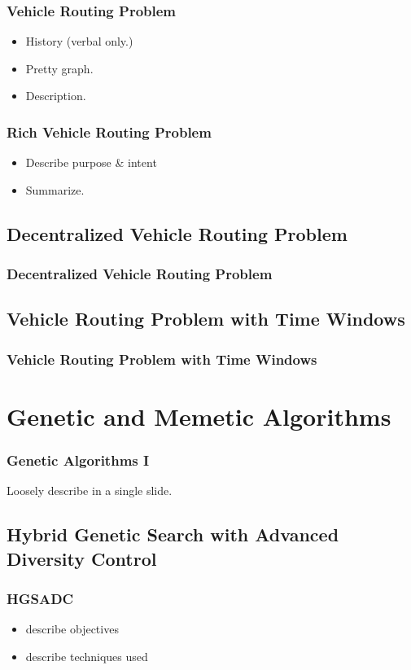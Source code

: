 \documentclass{beamer}
\begin{document}
\begin{frame}
\frametitle{Vehicle Routing Problem}
	\begin{itemize}
		\item History (verbal only.)
		\item Pretty graph.
		\item Description.
	\end{itemize}
\end{frame}

\begin{frame}
\frametitle{Rich Vehicle Routing Problem}
	\begin{itemize}
		\item Describe purpose \& intent
		\item Summarize.
	\end{itemize}
\end{frame}


\subsection{Decentralized Vehicle Routing Problem}

\begin{frame}
\frametitle{Decentralized Vehicle Routing Problem}
\end{frame}

\subsection{Vehicle Routing Problem with Time Windows}

\begin{frame}
\frametitle{Vehicle Routing Problem with Time Windows}
\end{frame}

\section{Genetic and Memetic Algorithms} 

\begin{frame}
\frametitle{Genetic Algorithms I}
	Loosely describe in a single slide. 
\end{frame}

\subsection{Hybrid Genetic Search with Advanced Diversity Control}

\begin{frame}
\frametitle{HGSADC}
	\begin{itemize}
		\item describe objectives
		\item describe techniques used
	\end{itemize}
\end{frame}
\end{document}
